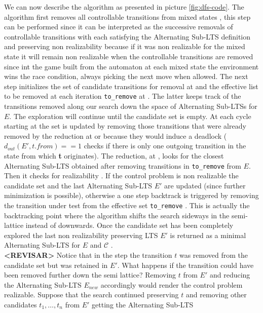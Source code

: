 We can now describe the algorithm as
presented in picture \ref{fig:dfs-code}. The algorithm first removes all controllable transitions from
mixed states , this step can be performed since it
can be interpreted as the successive removals of controllable 
transitions with each satisfying the Alternating Sub-LTS definition 
and preserving non realizability because if it was non realizable
for the mixed state it will remain non realizable when the controllable transitions are removed since int the game built from
the automaton at each mixed state the environment
wins the race condition, always picking the next move when allowed.
The next step initializes the set of 
candidate transitions
for removal at  and the effective list
to be removed at each iteration \texttt{to\_remove} at
.  The latter keeps track of the transitions
removed along our search down the space of
Alternating Sub-LTSs for $E$.  The exploration
will continue until the candidate set is empty.
At each cycle starting at  the set is updated  by 
removing those transitions that were already removed by the reduction
at  or because they would induce a deadlock 
($d_{out}(E', t.from) == 1$ checks if there is only one
outgoing transition in the state from which \textbf{t} originates).
The
reduction, at , looks for the closest
Alternating Sub-LTS obtained after removing 
transitions in \texttt{to\_remove} from $E$.
Then it checks for realizability .  If the control problem is non
realizable the candidate set and the last 
Alternating Sub-LTS $E'$ are updated (since further minimization is 
possible), otherwise a one step backtrack
is triggered by removing the transition under test from
the effective set \texttt{to\_remove} .
This is actually the backtracking point where the algorithm
shifts the search sideways in the semi-lattice instead of downwards.
Once the candidate set has been completely explored
the last non realizability preserving LTS $E'$ is
returned as a minimal Alternating Sub-LTS
for $E$ and $\mathcal{C}$ .\\
\textbf{<REVISAR>}
Notice that
in the step  the transition $t$ was removed
from the candidate set but was retained in $E'$.  What happens if
the transition could have been removed further down the semi lattice?  Removing $t$ from $E'$ and reducing the Alternating Sub-LTS 
$E_{new}$ accordingly would render the control problem realizable.  Suppose that
the search continued preserving $t$ and removing other candidates
$t_1, \ldots, t_n$ from $E'$ getting the Alternating Sub-LTS

